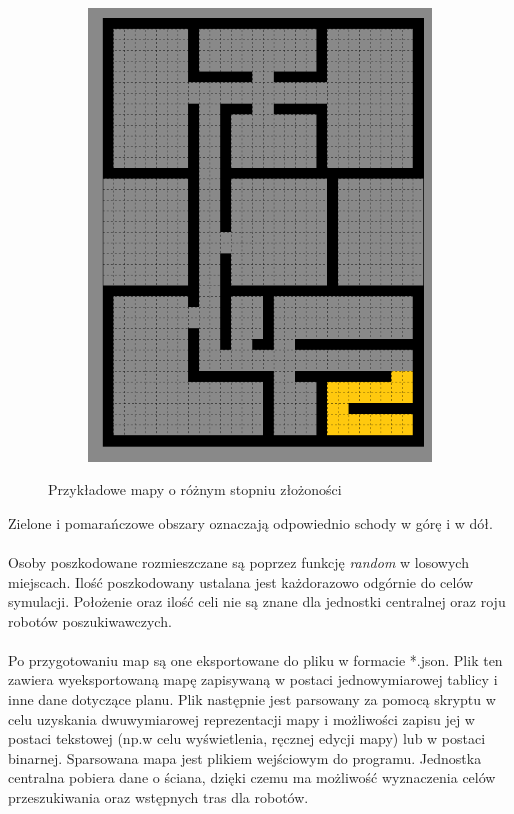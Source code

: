\begin{figure}[H]
\begin{subfigure}[b]{0.3\textwidth}
        \includegraphics[width=\textwidth]{figures/p3.png}
        \caption{}
        \label{fig:mouse}
    \end{subfigure}
    \caption{Przykładowe mapy o różnym stopniu złożoności}
    \label{fig:mapy}
\end{figure}

Zielone i pomarańczowe obszary oznaczają odpowiednio schody w górę i w dół.\\
\\
Osoby poszkodowane rozmieszczane są poprzez funkcję \textit{random} w losowych miejscach. Ilość poszkodowany ustalana jest każdorazowo odgórnie do celów symulacji. Położenie oraz ilość celi nie są znane dla jednostki centralnej oraz roju robotów poszukiwawczych.\\
\\
Po przygotowaniu map są one eksportowane do pliku w formacie *.json. Plik ten zawiera wyeksportowaną mapę zapisywaną w postaci jednowymiarowej tablicy i inne dane dotyczące planu. Plik następnie jest parsowany za pomocą skryptu w celu uzyskania dwuwymiarowej reprezentacji mapy i możliwości zapisu jej w postaci tekstowej (np.\@ w celu wyświetlenia, ręcznej edycji mapy) lub w postaci binarnej. Sparsowana mapa jest plikiem wejściowym do programu. Jednostka centralna pobiera dane o ściana, dzięki czemu ma możliwość wyznaczenia celów przeszukiwania oraz wstępnych tras dla robotów.